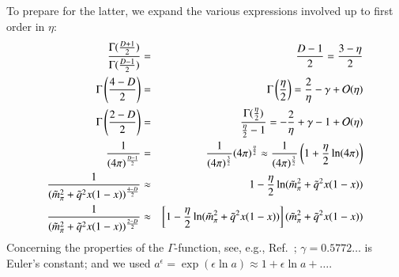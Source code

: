 \documentclass[sort&compress,preprint,3p]{elsarticle}
\begin{document}
To prepare for the latter, we expand the various expressions involved
up to first order in $\eta$:
%
\begin{eqnarray}
\frac{\Gamma(\frac{D+1}{2})}{\Gamma(\frac{D-1}{2})}
&=& \frac{D-1}{2} = \frac{3-\eta}{2}
\nonumber \\
\Gamma\left(\frac{4-D}{2}\right) &=&
\Gamma\left(\frac{\eta}{2}\right)
=  \frac 2 \eta - \gamma + {\cal O}(\eta)
\nonumber \\
\Gamma\left(\frac{2-D}{2}\right) &=&
\frac{\Gamma(\frac{\eta}{2})}{\frac \eta 2 -1}
=  -\frac 2 \eta + \gamma -1 + {\cal O}(\eta)
\nonumber \\
\frac{1}{(4 \pi)^{\frac{D-1}{2}}} &=& \frac{1}{(4 \pi)^{\frac{3}{2}}} (4\pi)^{\frac{\eta}{2}}
\approx \frac{1}{(4 \pi)^{\frac{3}{2}}} \left(1+\frac{\eta}{2} \ln(4\pi)\right)
\nonumber \\
\frac{1}{(\tilde{m}_\pi^2 + \tilde{q}^2 x (1-x))^{\frac{4-D}{2}}} &\approx&
1-\frac{\eta}{2} \ln(\tilde{m}_\pi^2 + \tilde{q}^2 x (1-x))
\nonumber \\
\frac{1}{(\tilde{m}_\pi^2 + \tilde{q}^2 x (1-x))^{\frac{2-D}{2}}} &\approx&
\left[1-\frac{\eta}{2} \ln(\tilde{m}_\pi^2 + \tilde{q}^2 x (1-x))\right]
(\tilde{m}_\pi^2 + \tilde{q}^2 x (1-x))
\label{eq_eta}
\end{eqnarray}
%
Concerning the properties of the $\Gamma$-function, see, e.g.,
Ref.~\cite{AS70}; $\gamma = 0.5772\ldots$ is Euler's constant; 
and we used $a^\epsilon=\exp(\epsilon \ln a)\approx 1+\epsilon \ln a + \ldots$.
\end{document}

